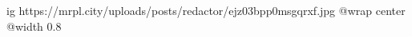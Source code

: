  
 
 
 
 

\ifcmt
  ig https://mrpl.city/uploads/posts/redactor/ejz03bpp0msgqrxf.jpg
  @wrap center
  @width 0.8
\fi
